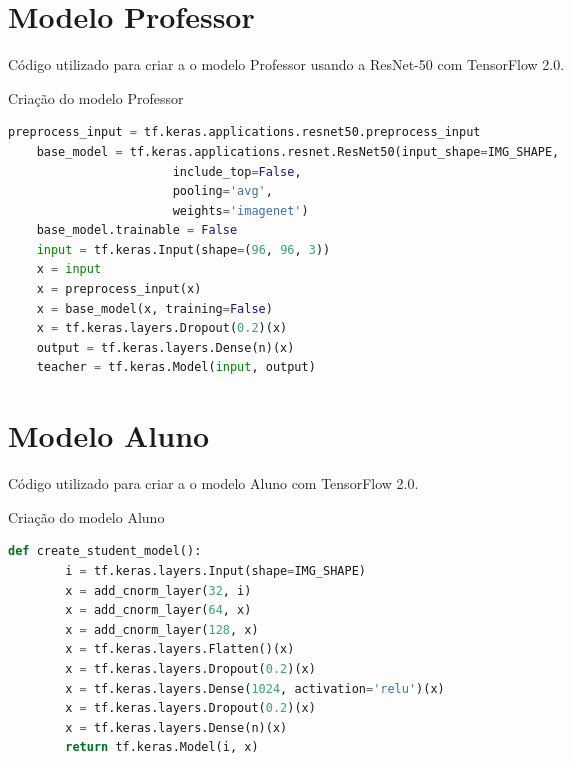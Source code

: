 \begin{apendicesenv}

\partapendices

\chapter{Modelo Professor}\label{apendice_professor}

Código utilizado para criar a o modelo Professor usando a ResNet-50 \cite{resnet} com TensorFlow 2.0.

\begin{codigo}[!htb]
    \caption{Criação do modelo Professor}
    \label{res_professor}
    \begin{lstlisting}[language = python]
	preprocess_input = tf.keras.applications.resnet50.preprocess_input
	base_model = tf.keras.applications.resnet.ResNet50(input_shape=IMG_SHAPE,
					   include_top=False,
					   pooling='avg',
					   weights='imagenet')
	base_model.trainable = False
	input = tf.keras.Input(shape=(96, 96, 3))
	x = input
	x = preprocess_input(x)
	x = base_model(x, training=False)
	x = tf.keras.layers.Dropout(0.2)(x)
	output = tf.keras.layers.Dense(n)(x)
	teacher = tf.keras.Model(input, output)
    \end{lstlisting}
\end{codigo}

\chapter{Modelo Aluno}\label{apendice_aluno}
Código utilizado para criar a o modelo Aluno com TensorFlow 2.0.

\begin{codigo}[!htb]
    \caption{Criação do modelo Aluno}
    \label{res_aluno_1}
    \begin{lstlisting}[language = python]
	def create_student_model():
		i = tf.keras.layers.Input(shape=IMG_SHAPE)
		x = add_cnorm_layer(32, i)
		x = add_cnorm_layer(64, x)
		x = add_cnorm_layer(128, x)
		x = tf.keras.layers.Flatten()(x)
		x = tf.keras.layers.Dropout(0.2)(x)
		x = tf.keras.layers.Dense(1024, activation='relu')(x)
		x = tf.keras.layers.Dropout(0.2)(x)
		x = tf.keras.layers.Dense(n)(x)
		return tf.keras.Model(i, x)


\end{lstlisting}
\end{codigo}
\end{apendicesenv}
